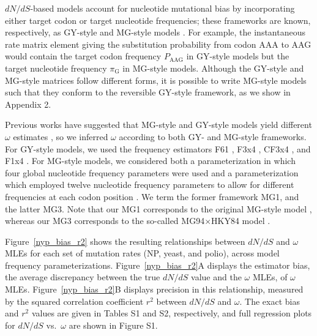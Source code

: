 \documentclass[11pt]{article}
\begin{document}
$dN/dS$-based models account for nucleotide mutational bias by incorporating either target codon \cite{GoldmanYang1994} or target nucleotide \cite{MuseGaut1994} frequencies; these frameworks are known, respectively, as GY-style and MG-style models \cite{KosakovskyPond2010}. For example, the instantaneous rate matrix element giving the substitution probability from codon AAA to AAG would contain the target codon frequency $P_\text{AAG}$ in GY-style models but the target nucleotide frequency $\pi_\text{G}$ in MG-style models. Although the GY-style and MG-style matrices follow different forms, it is possible to write MG-style models such that they conform to the reversible GY-style framework, as we show in Appendix 2.

Previous works have suggested that MG-style and GY-style models yield different $\omega$ estimates \cite{KosakovskyPondMuse2005,Yap2010}, so we inferred $\omega$ according to both GY- and MG-style frameworks. For GY-style models, we used the frequency estimators F61 \cite{GoldmanYang1994}, F3x4 \cite{GoldmanYang1994}, CF3x4 \cite{KosakovskyPond2010}, and F1x4 \cite{MuseGaut1994}. For MG-style models, we considered both a parameterization in which four global nucleotide frequency parameters were used \cite{MuseGaut1994} and a parameterization which employed twelve nucleotide frequency parameters to allow for different frequencies at each codon position \cite{KosakovskyPondMuse2005}. We term the former framework MG1, and the latter MG3. Note that our MG1 corresponds to the original MG-style model \cite{MuseGaut1994}, whereas our MG3 corresponds to the so-called MG94$\times$HKY84 model \cite{KosakovskyPondMuse2005}. 

Figure~\ref{nyp_bias_r2} shows the resulting relationships between $dN/dS$ and $\omega$ MLEs for each set of mutation rates (NP, yeast, and polio), across model frequency parameterizations. Figure~\ref{nyp_bias_r2}A displays the estimator bias, the average discrepancy between the true $dN/dS$ value and the $\omega$ MLEs, of $\omega$ MLEs. Figure~\ref{nyp_bias_r2}B displays precision in this relationship, measured by the squared correlation coefficient $r^2$ between $dN/dS$ and $\omega$. The exact bias and $r^2$ values are given in Tables S1 and S2, respectively, and full regression plots for $dN/dS$ vs.\ $\omega$ are shown in Figure S1.
\end{document}

